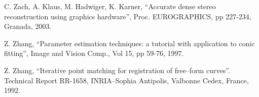 \documentclass[twocolumn,oneside]{book}
\begin{document}
\begin{thebibliography}{99}
C. Zach, A. Klaus, M. Hadwiger, K. Karner,
``Accurate dense stereo reconstruction using graphics hardware'',
Proc. EUROGRAPHICS, pp 227-234, Granada, 2003.

Z. Zhang,
``Parameter estimation techniques: a tutorial with application to conic fitting'',
Image and Vision Comp., Vol 15, pp 59-76, 1997.

Z. Zhang,
``Iterative point matching for registration of free--form curves''.
Technical Report RR-1658, INRIA--Sophia Antipolis, Valbonne Cedex, France,
1992.

\end{thebibliography}
\end{document}
